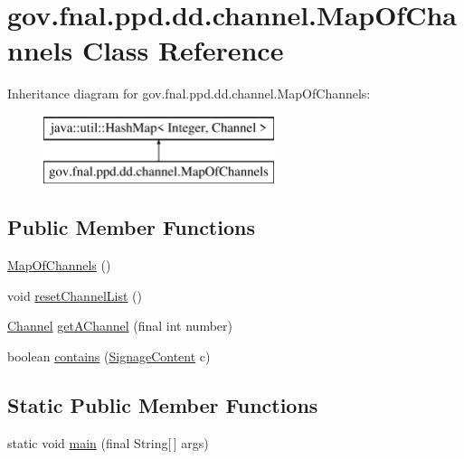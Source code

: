 \hypertarget{classgov_1_1fnal_1_1ppd_1_1dd_1_1channel_1_1MapOfChannels}{\section{gov.\-fnal.\-ppd.\-dd.\-channel.\-Map\-Of\-Channels Class Reference}
\label{classgov_1_1fnal_1_1ppd_1_1dd_1_1channel_1_1MapOfChannels}
}
Inheritance diagram for gov.\-fnal.\-ppd.\-dd.\-channel.\-Map\-Of\-Channels\-:\begin{figure}[H]
\begin{center}
\leavevmode
\includegraphics[height=2.000000cm]{classgov_1_1fnal_1_1ppd_1_1dd_1_1channel_1_1MapOfChannels}
\end{center}
\end{figure}
\subsection*{Public Member Functions}
\begin{DoxyCompactItemize}
\item 
\hyperlink{classgov_1_1fnal_1_1ppd_1_1dd_1_1channel_1_1MapOfChannels_a50904afe8dc2195a5bdc156efc32e065}{Map\-Of\-Channels} ()
\item 
void \hyperlink{classgov_1_1fnal_1_1ppd_1_1dd_1_1channel_1_1MapOfChannels_a2631777fd0adabe06c3c3941190e4e0b}{reset\-Channel\-List} ()
\item 
\hyperlink{interfacegov_1_1fnal_1_1ppd_1_1dd_1_1signage_1_1Channel}{Channel} \hyperlink{classgov_1_1fnal_1_1ppd_1_1dd_1_1channel_1_1MapOfChannels_a1fe019368302baecc21d10cf1def241a}{get\-A\-Channel} (final int number)
\item 
boolean \hyperlink{classgov_1_1fnal_1_1ppd_1_1dd_1_1channel_1_1MapOfChannels_abc6f10d676361ad8d26cb8e6a581cc31}{contains} (\hyperlink{interfacegov_1_1fnal_1_1ppd_1_1dd_1_1signage_1_1SignageContent}{Signage\-Content} c)
\end{DoxyCompactItemize}
\subsection*{Static Public Member Functions}
\begin{DoxyCompactItemize}
\item 
static void \hyperlink{classgov_1_1fnal_1_1ppd_1_1dd_1_1channel_1_1MapOfChannels_a2e3cd81fac45f2de2333d26dc534b699}{main} (final String\mbox{[}$\,$\mbox{]} args)
\end{DoxyCompactItemize}


